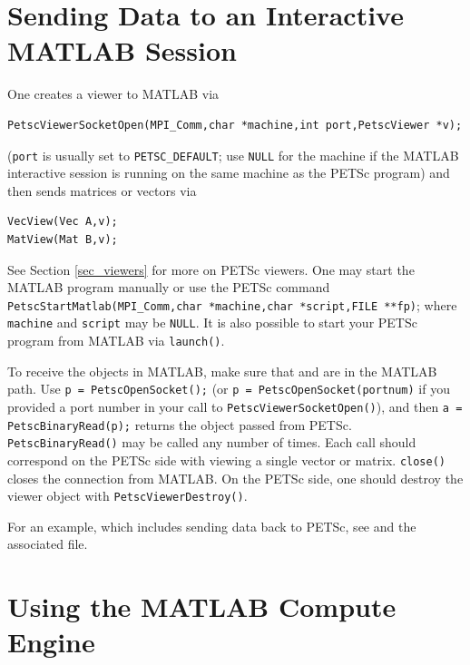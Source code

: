\section{Sending Data to an Interactive MATLAB Session}
\label{sec_matlabsocket}

One creates a viewer to MATLAB via
\begin{lstlisting}
PetscViewerSocketOpen(MPI_Comm,char *machine,int port,PetscViewer *v);
\end{lstlisting}
(\lstinline{port} is usually set to \lstinline{PETSC_DEFAULT}; use \lstinline{NULL} for the machine if the
MATLAB interactive session is running on the same machine as the PETSc program)
and then sends matrices or vectors via
\begin{lstlisting}
VecView(Vec A,v);
MatView(Mat B,v);
\end{lstlisting}
See Section \ref{sec_viewers} for more on PETSc viewers.
One may start the MATLAB program manually or use the PETSc command
\lstinline{PetscStartMatlab(MPI_Comm,char *machine,char *script,FILE **fp)}; where \lstinline{machine} and \lstinline{script} may be \lstinline{NULL}.
It is also possible to start your PETSc program from MATLAB via \lstinline{launch()}.

To receive the objects in MATLAB, make sure that  and 
are in the MATLAB path. Use \break\lstinline{p = PetscOpenSocket();} (or \lstinline{p = PetscOpenSocket(portnum)} if you provided a port number in
your call to \lstinline{PetscViewerSocketOpen()}), and then \lstinline{a = PetscBinaryRead(p);} returns the object passed from PETSc.
\lstinline{PetscBinaryRead()} may be called any number of times. Each call should correspond on the PETSc side with
viewing a single vector or matrix. \lstinline{close()} closes the connection from MATLAB.
On the PETSc side, one should destroy the viewer object with \lstinline{PetscViewerDestroy()}. 

For an example, which includes sending data back to PETSc, see \href{http://www.mcs.anl.gov/petsc/petsc-current/src/vec/vec/examples/tutorials/ex42.c.html}{} and the associated  file.

\section{Using the MATLAB Compute Engine}
\label{sec_matlabengine}

